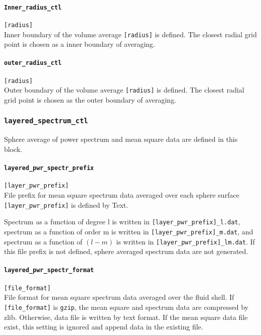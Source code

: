 \paragraph{\tt Inner\_radius\_ctl}
\label{href_t:inner_radius_ctl}
\verb|[radius]| \\
Inner boundary of the volume average \verb|[radius]| is defined. The closest radial grid point is chosen as a inner boundary of averaging.

\paragraph{\tt outer\_radius\_ctl}
\label{href_t:outer_radius_ctl}
\verb|[radius]| \\
Outer boundary of the volume average \verb|[radius]| is defined. The closest radial grid point is chosen as the outer boundary of averaging.

%
\subsubsection{\tt layered\_spectrum\_ctl}
\label{href_t:layered_spectrum_ctl}
Sphere average of power spectrum and mean square data are defined in this block.

\paragraph{\tt layered\_pwr\_spectr\_prefix}
\label{href_t:layered_pwr_spectr_prefix}
\verb|[layer_pwr_prefix]| \\
File prefix for mean square spectrum data averaged over each sphere surface \verb|[layer_pwr_prefix]| is defined by Text.

Spectrum as a function of degree {l} is written in \verb|[layer_pwr_prefix]_l.dat|, spectrum as a function of order {m} is written in \verb|[layer_pwr_prefix]_m.dat|, and spectrum as a function of $(l-m)$ is written in \verb|[layer_pwr_prefix]_lm.dat|. If this file prefix is not defined, sphere averaged spectrum data are not generated. 

\paragraph{\tt layered\_pwr\_spectr\_format}
\label{href_t:layered_pwr_spectr_format}
\verb|[file_format]| \\
File format for mean square spectrum data averaged over the fluid shell. If \verb|[file_format]| is \verb|gzip|, the mean square and spectrum data are compressed by zlib. Otherwise, data file is written by text format. If the mean square data file exist, this setting is ignored and append data in the existing file.

